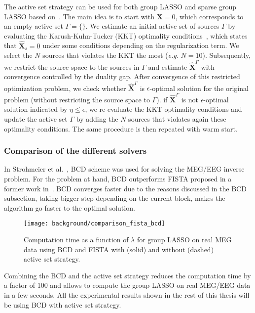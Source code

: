The active set strategy can be used for both group LASSO and sparse group LASSO based on~\cite{roth2008group,wang2014two}. The main idea is to start with $\mathbf{X}=0$, which corresponds to an empty active set $\Gamma=\{\}$. We estimate an initial active set of sources $\Gamma$ by evaluating the Karush-Kuhn-Tucker (KKT) optimality conditions~\cite{roth2008group,wang2014two}, which states that $\hat{\mathbf{X}}_s=0$ under some conditions depending on the regularization term. We select the $N$ sources that violates the KKT the most (\textit{e.g.} $N=10$). Subsequently, we restrict the source space to the sources in $\Gamma$ and estimate $\hat{\mathbf{X}}^{\Gamma}$ with convergence controlled by the duality gap. After convergence of this restricted optimization problem, we check whether $\hat{\mathbf{X}}^{\Gamma}$ is $\epsilon$-optimal solution for the original problem (without restricting the source space to $\Gamma$). if $\hat{\mathbf{X}}^{\Gamma}$ is not $\epsilon$-optimal solution indicated by $\eta \leq \epsilon$, we re-evaluate the KKT optimality conditions and update the active set $\Gamma$ by adding the $N$ sources that violates again these optimality conditions. The same procedure is then repeated with warm start.


\subsubsection*{Comparison of the different solvers}\label{section:comparison_solvers}
In Strohmeier et al.~\cite{strohmeier-etal:16}, BCD scheme was used for solving the MEG/EEG inverse problem. For the problem at hand, BCD outperforms FISTA proposed in a former work in~\cite{gramfort2012mixed}. BCD converges faster due to the reasons discussed in the BCD subsection, taking bigger step depending on the current block, makes the algorithm go faster to the optimal solution.

\begin{figure}
	\centering
	\texttt{[image: background/comparison\_fista\_bcd]}
    \caption{Computation time as a function of $\lambda$ for group LASSO on real MEG data using BCD and FISTA with (solid) and without (dashed) active set strategy.}
    \label{fig:comparison_fista_bcd}
\end{figure}
Combining the BCD and the active set strategy reduces the computation time by a factor of 100 and allows to compute the group LASSO on real MEG/EEG data in a few seconds. All the experimental results shown in the rest of this thesis will be using BCD with active set strategy.


